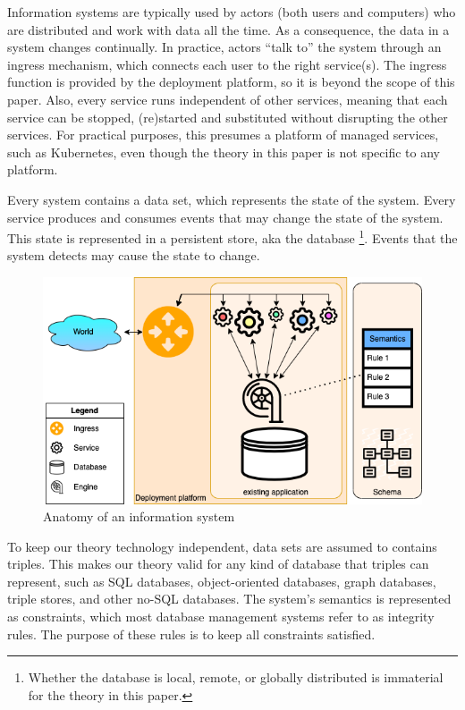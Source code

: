 \documentclass{elsarticle}
\begin{document}
   Information systems are typically used by actors (both users and computers) who are distributed and work with data all the time.
   As a consequence, the data in a system changes continually.
   In practice, actors ``talk to'' the system through an ingress mechanism, which connects each user to the right service(s).
   The ingress function is provided by the deployment platform, so it is beyond the scope of this paper.
   Also, every service runs independent of other services,
   meaning that each service can be stopped, (re)started and substituted without disrupting the other services.
   For practical purposes, this presumes a platform of managed services, such as Kubernetes,
   even though the theory in this paper is not specific to any platform.

   Every system contains a data set, which represents the state of the system.
   Every service produces and consumes events that may change the state of the system.
   This state is represented in a persistent store, aka the database%
\footnote{Whether the database is local, remote, or globally distributed is immaterial for the theory in this paper.}.
   Events that the system detects may cause the state to change.
\begin{figure}[bht]
   \begin{center}
     \includegraphics[scale=.45]{figures/datamigration-Pre-migration.png}
   \end{center}
\caption{Anatomy of an information system}
\label{fig:pre-migration}
\end{figure}
   To keep our theory technology independent, data sets are assumed to contains triples.
   This makes our theory valid for any kind of database that triples can represent,
   such as SQL databases, object-oriented databases, graph databases, triple stores, and other no-SQL databases.
   The system's semantics is represented as constraints,
   which most database management systems refer to as integrity rules.
   The purpose of these rules is to keep all constraints satisfied.
\end{document}

